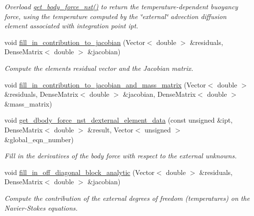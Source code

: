 \begin{DoxyCompactItemize}
\begin{DoxyCompactList}\small\item\em Overload \hyperlink{classoomph_1_1RefineableNavierStokesBoussinesqElement_a7c422f8666f9acef4d26f187a4dc4e28}{get\+\_\+body\+\_\+force\+\_\+nst()} to return the temperature-\/dependent buoyancy force, using the temperature computed by the \char`\"{}external\char`\"{} advection diffusion element associated with integration point {\ttfamily ipt}. \end{DoxyCompactList}\item 
void \hyperlink{classoomph_1_1RefineableNavierStokesBoussinesqElement_aab6bae7d0704ab7e3e121ee594ac887a}{fill\+\_\+in\+\_\+contribution\+\_\+to\+\_\+jacobian} (Vector$<$ double $>$ \&residuals, Dense\+Matrix$<$ double $>$ \&jacobian)
\begin{DoxyCompactList}\small\item\em Compute the element\textquotesingle{}s residual vector and the Jacobian matrix. \end{DoxyCompactList}\item 
void \hyperlink{classoomph_1_1RefineableNavierStokesBoussinesqElement_a02e9c7f347aa1c6defbcb20049fc8985}{fill\+\_\+in\+\_\+contribution\+\_\+to\+\_\+jacobian\+\_\+and\+\_\+mass\+\_\+matrix} (Vector$<$ double $>$ \&residuals, Dense\+Matrix$<$ double $>$ \&jacobian, Dense\+Matrix$<$ double $>$ \&mass\+\_\+matrix)
\item 
void \hyperlink{classoomph_1_1RefineableNavierStokesBoussinesqElement_a4450f88be1c003160b9fa99df70a923b}{get\+\_\+dbody\+\_\+force\+\_\+nst\+\_\+dexternal\+\_\+element\+\_\+data} (const unsigned \&ipt, Dense\+Matrix$<$ double $>$ \&result, Vector$<$ unsigned $>$ \&global\+\_\+eqn\+\_\+number)
\begin{DoxyCompactList}\small\item\em Fill in the derivatives of the body force with respect to the external unknowns. \end{DoxyCompactList}\item 
void \hyperlink{classoomph_1_1RefineableNavierStokesBoussinesqElement_a9609dc454ef3d29b1e256fa32fb2c665}{fill\+\_\+in\+\_\+off\+\_\+diagonal\+\_\+block\+\_\+analytic} (Vector$<$ double $>$ \&residuals, Dense\+Matrix$<$ double $>$ \&jacobian)
\begin{DoxyCompactList}\small\item\em Compute the contribution of the external degrees of freedom (temperatures) on the Navier-\/\+Stokes equations. \end{DoxyCompactList}\item 

\end{DoxyCompactItemize}
